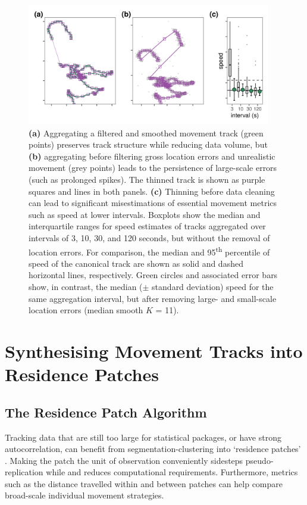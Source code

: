\documentclass[10pt,paper=a4,headings=standardclasses
]{scrartcl}
\begin{document}
\begin{figure}[h!]
    \centering
    \includegraphics[width=0.95\textwidth]{figures/fig_04_thinning.png}
    \caption{\textbf{(a)} Aggregating a filtered and smoothed movement track (green points) preserves track structure while reducing data volume, but \textbf{(b)} aggregating before filtering gross location errors and unrealistic movement (grey points) leads to the persistence of large-scale errors (such as prolonged spikes).
    The thinned track is shown as purple squares and lines in both panels.
    \textbf{(c)} Thinning before data cleaning can lead to significant misestimations of essential movement metrics such as speed at lower intervals.
    Boxplots show the median and interquartile ranges for speed estimates of tracks aggregated over intervals of 3, 10, 30, and 120 seconds, but without the removal of location errors.
    For comparison, the median and 95\textsuperscript{th} percentile of speed of the canonical track are shown as solid and dashed horizontal lines, respectively.
    Green circles and associated error bars show, in contrast, the median ($\pm$ standard deviation) speed for the same aggregation interval, but after removing large- and small-scale location errors (median smooth $K$ = 11).}
    \label{fig:figure_thinning}
\end{figure}

\section{Synthesising Movement Tracks into Residence Patches}

\subsection{The Residence Patch Algorithm}

Tracking data that are still too large for statistical packages, or have strong autocorrelation, can benefit from segmentation-clustering into `residence patches' \citep{bijleveld2016, oudman2018, barraquand2008}.
Making the patch the unit of observation conveniently sidesteps pseudo-replication while and reduces computational requirements.
Furthermore, metrics such as the distance travelled within and between patches can help compare broad-scale individual movement strategies.
\end{document}
